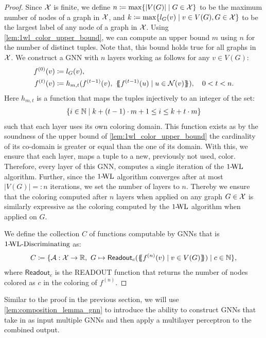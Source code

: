 \begin{proof}
Since $\mathcal{X}$ is finite, we define $n \coloneqq \max \{ |V(G)| \mid G \in \mathcal{X} \}$ to be the maximum number of nodes of a graph in $\mathcal{X}$, and $k \coloneqq \max \{ l_G(v) \mid v \in V(G), G \in \mathcal{X} \}$ to be the largest label of any node of a graph in $\mathcal{X}$. Using \cref{lem:1wl_color_upper_bound}, we can compute an upper bound $m$ using $n$ for the number of distinct tuples. Note that, this bound holds true for all graphs in $\mathcal{X}$. We construct a GNN with $n$ layers working as follows for any $v \in V(G)$: 
\begin{align*}
    f^{(0)}(v) &\coloneqq l_G(v), \\
    f^{(t)}(v) &\coloneqq h_{m,t}(f^{(t-1)}(v), \ \{\!\!\{ f^{(t-1)}(u) \mid u \in \mathcal{N}(v)\}\!\!\}), \quad 0 < t < n.
\end{align*}
Here $h_{m,t}$ is a function that maps the tuples injectively to an integer of the set:
\begin{align*}\{i \in \mathbb{N} \mid k + (t-1)\cdot m +1 \leq i \leq k + t \cdot m\}
\end{align*}
such that each layer uses its own coloring domain. This function exists as by the soundness of the upper bound of \cref{lem:1wl_color_upper_bound} the cardinality of its co-domain is greater or equal than the one of its domain. With this, we ensure that each layer, maps a tuple to a new, previously not used, color. Therefore, every layer of this GNN, computes a single iteration of the $\text{1-\!WL}$ algorithm. Further, since the $\text{1-\!WL}$ algorithm converges after at most $|V(G)| =: n$ iterations, we set the number of layers to $n$. Thereby we ensure that the coloring computed after $n$ layers when applied on any graph $G \in \mathcal{X}$ is similarly expressive as the coloring computed by the $\text{1-\!WL}$ algorithm when applied on $G$.

We define the collection $C$ of functions computable by GNNs that is $\text{1-\!WL-Discriminating}$ as: 
\begin{align*}
C \coloneqq \{ \mathcal{A}: \mathcal{X} \rightarrow \mathbb{R}, \ G \mapsto \textsf{Readout}_c(\{\!\!\{ f^{(n)}(v) \mid v \in V(G) \}\!\!\}) \mid c \in \mathbb{N} \},
\end{align*}
where $\textsf{Readout}_c$ is the \textsf{READOUT} function that returns the number of nodes colored as $c$ in the coloring of $f^{(n)}$.
\end{proof}

Similar to the proof in the previous section, we will use \cref*{lem:composition_lemma_gnn} to introduce the ability to construct GNNs that take in as input multiple GNNs and then apply a multilayer perceptron to the combined output.


